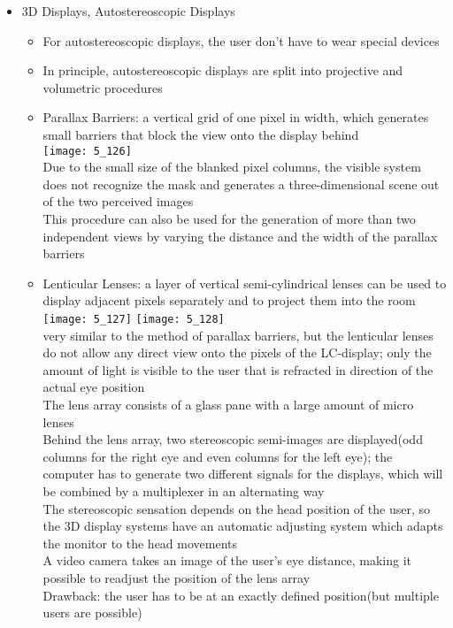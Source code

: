 \documentclass{standalone}
\begin{document}
\begin{itemize}
	\item 3D Displays, Autostereoscopic Displays
	\begin{itemize}
		\item For autostereoscopic displays, the user don't have to wear special devices
		\item In principle, autostereoscopic displays are split into projective and volumetric procedures
		\item Parallax Barriers: a vertical grid of one pixel in width, which generates small barriers that block the view onto the display behind \\
		\texttt{[image: 5\_126]} \\
		Due to the small size of the blanked pixel columns, the visible system does not recognize the mask and generates a three-dimensional scene out of the two perceived images \\
		This procedure can also be used for the generation of more than two independent views by varying the distance and the width of the parallax barriers
		\item Lenticular Lenses: a layer of vertical semi-cylindrical lenses can be used to display adjacent pixels separately and to project them into the room \\
		\texttt{[image: 5\_127]} \texttt{[image: 5\_128]}\\
		very similar to the method of parallax barriers, but the lenticular lenses do not allow any direct view onto the pixels of the LC-display; only the amount of light is visible to the user that is refracted in direction of the actual eye position \\
		The lens array consists of a glass pane with a large amount of micro lenses \\
		Behind the lens array, two stereoscopic semi-images are displayed(odd columns for the right eye and even columns for the left eye); the computer has to generate two different signals for the displays, which will be combined by a multiplexer in an alternating way \\
		The stereoscopic sensation depends on the head position of the user, so the 3D display systems have an automatic adjusting system which adapts the monitor to the head movements \\
		A video camera takes an image of the user's eye distance, making it possible to readjust the position of the lens array \\
		Drawback: the user has to be at an exactly defined position(but multiple users are possible)

\end{itemize}
\end{itemize}
\end{document}
